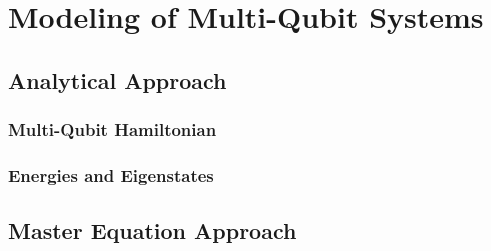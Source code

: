 \chapter{Modeling of Multi-Qubit Systems}


\section{Analytical Approach}

\subsection{Multi-Qubit Hamiltonian}


\subsection{Energies and Eigenstates}


\section{Master Equation Approach} \label{section:three_level_simulation}

